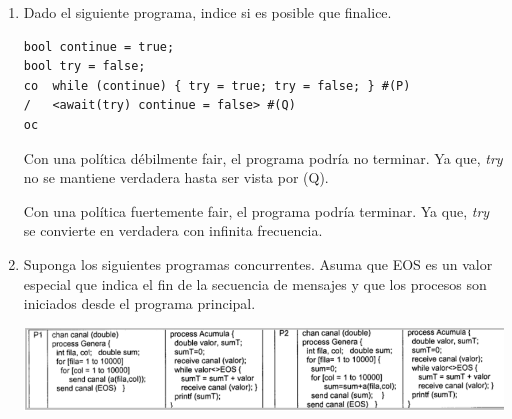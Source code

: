 \documentclass[a4paper, 10pt]{article}
\newenvironment{QandA}{
    \begin{enumerate}\bfseries}
    {\end{enumerate}
}
\newenvironment{answered}{\par\normalfont}{}
\begin{document}
\begin{QandA}
\begin{enumerate}
\begin{answered}
Asignaciones P$_{8} = 128^2 \times 2 + 128 \times 2 = 33024$

Sumas P$_{8} = 128^2 \times 2 = 32768$

Productos P$_{8} = 128^2 \times 2 = 32768$

Tiempo P$_8$ $= 33024 \times 1 ut + 32768 \times 2 ut + 32768 \times 3 = 196864 ut$

Asignaciones P$_{resto} = 128^2 \times 18 + 128 \times 18 = 297216$

Sumas P$_{resto} = 128^2 \times 18 = 294912$

Productos P$_{resto} = 128^2 \times 2 = 294912$

Tiempo P$_{resto}= 297216 \times 1 ut + 294912 \times 2 ut + 294912 \times 3 = 1771776 ut$

Con estos nuevos tiempos el speedup será de 7,1.
\end{answered}
\end{enumerate}

\item Dado el siguiente programa, indice si es posible que finalice.

\begin{lstlisting}
bool continue = true;
bool try = false;
co  while (continue) { try = true; try = false; } #(P)
/   <await(try) continue = false> #(Q)
oc
\end{lstlisting}

\begin{answered}
Con una política débilmente fair, el programa podría no terminar. Ya que, \emph{try} no se mantiene verdadera hasta ser vista por (Q).

Con una política fuertemente fair, el programa podría terminar. Ya que, \emph{try} se convierte en verdadera con infinita frecuencia.
\end{answered}

\item Suponga los siguientes programas concurrentes. Asuma que EOS es un valor especial que indica el fin de la secuencia de mensajes y que los procesos son iniciados desde el programa principal.

\includegraphics[]{assets/ejercicio-22.png}


\end{QandA}
\end{document}
